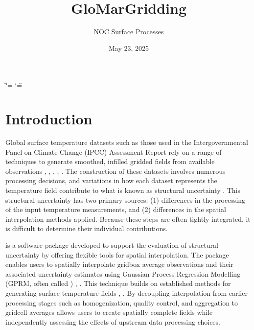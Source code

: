 \documentclass[letterpaper,10pt,english]{sphinxmanual}
\title{GloMarGridding}
\date{May 23, 2025}
\author{NOC Surface Processes}
\begin{document}
\ifdefined\shorthandoff
  \ifnum\catcode`\=\string=\active\shorthandoff{=}\fi
  \ifnum\catcode`\"=\active{}\fi
\fi

\pagestyle{empty}
\sphinxmaketitle
\pagestyle{plain}
\sphinxtableofcontents
\pagestyle{normal}
\label{\detokenize{index::doc}}


\sphinxstepscope


\chapter{Introduction}
\label{\detokenize{introduction:introduction}}\label{\detokenize{introduction::doc}}
\sphinxAtStartPar
Global surface temperature datasets \sphinxhyphen{} such as those used in the Intergovernmental Panel on Climate
Change (IPCC) Assessment Report  rely on a range of techniques to generate smoothed, infilled
gridded fields from available observations , , , ,
 . The construction of these datasets involves numerous processing decisions, and variations
in how each dataset represents the temperature field contribute to what is known as structural
uncertainty . This structural uncertainty has two primary sources: (1) differences in the
processing of the input temperature measurements, and (2) differences in the spatial interpolation
methods applied. Because these steps are often tightly integrated, it is difficult to determine
their individual contributions.

\sphinxAtStartPar
{} is a software package developed to support the evaluation of structural
uncertainty by offering flexible tools for spatial interpolation. The package enables users to
spatially interpolate grid\sphinxhyphen{}box average observations and their associated uncertainty estimates using
Gaussian Process Regression Modelling (GPRM, often called ) ,  . This
technique builds on established methods for generating surface temperature fields ,
. By decoupling interpolation from earlier processing stages \sphinxhyphen{} such as homogenization,
quality control, and aggregation to grid\sphinxhyphen{}cell averages \sphinxhyphen{}  allows users to create
spatially complete fields while independently assessing the effects of upstream data processing
choices.
\end{document}
